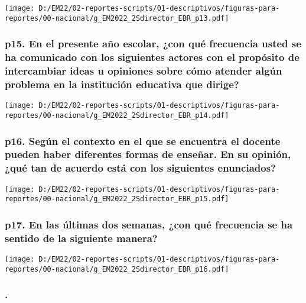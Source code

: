 \documentclass[
]{article}
\begin{document}
\texttt{[image: D:/EM22/02-reportes-scripts/01-descriptivos/figuras-para-reportes/00-nacional/g\_EM2022\_2Sdirector\_EBR\_p13.pdf]}

\hypertarget{p15.-en-el-presente-auxf1o-escolar-con-quuxe9-frecuencia-usted-se-ha-comunicado-con-los-siguientes-actores-con-el-propuxf3sito-de-intercambiar-ideas-u-opiniones-sobre-cuxf3mo-atender-alguxfan-problema-en-la-instituciuxf3n-educativa-que-dirige}{%
\subsubsection{p15. En el presente año escolar, ¿con qué frecuencia
usted se ha comunicado con los siguientes actores con el propósito de
intercambiar ideas u opiniones sobre cómo atender algún problema en la
institución educativa que
dirige?}\label{p15.-en-el-presente-auxf1o-escolar-con-quuxe9-frecuencia-usted-se-ha-comunicado-con-los-siguientes-actores-con-el-propuxf3sito-de-intercambiar-ideas-u-opiniones-sobre-cuxf3mo-atender-alguxfan-problema-en-la-instituciuxf3n-educativa-que-dirige}}

\texttt{[image: D:/EM22/02-reportes-scripts/01-descriptivos/figuras-para-reportes/00-nacional/g\_EM2022\_2Sdirector\_EBR\_p14.pdf]}

\hypertarget{p16.-seguxfan-el-contexto-en-el-que-se-encuentra-el-docente-pueden-haber-diferentes-formas-de-enseuxf1ar.-en-su-opiniuxf3n-quuxe9-tan-de-acuerdo-estuxe1-con-los-siguientes-enunciados}{%
\subsubsection{p16. Según el contexto en el que se encuentra el docente
pueden haber diferentes formas de enseñar. En su opinión, ¿qué tan de
acuerdo está con los siguientes
enunciados?}\label{p16.-seguxfan-el-contexto-en-el-que-se-encuentra-el-docente-pueden-haber-diferentes-formas-de-enseuxf1ar.-en-su-opiniuxf3n-quuxe9-tan-de-acuerdo-estuxe1-con-los-siguientes-enunciados}}

\texttt{[image: D:/EM22/02-reportes-scripts/01-descriptivos/figuras-para-reportes/00-nacional/g\_EM2022\_2Sdirector\_EBR\_p15.pdf]}

\hypertarget{p17.-en-las-uxfaltimas-dos-semanas-con-quuxe9-frecuencia-se-ha-sentido-de-la-siguiente-manera}{%
\subsubsection{p17. En las últimas dos semanas, ¿con qué frecuencia se
ha sentido de la siguiente
manera?}\label{p17.-en-las-uxfaltimas-dos-semanas-con-quuxe9-frecuencia-se-ha-sentido-de-la-siguiente-manera}}

\texttt{[image: D:/EM22/02-reportes-scripts/01-descriptivos/figuras-para-reportes/00-nacional/g\_EM2022\_2Sdirector\_EBR\_p16.pdf]}

\hypertarget{section}{%
\subsubsection{.}\label{section}}
\end{document}
